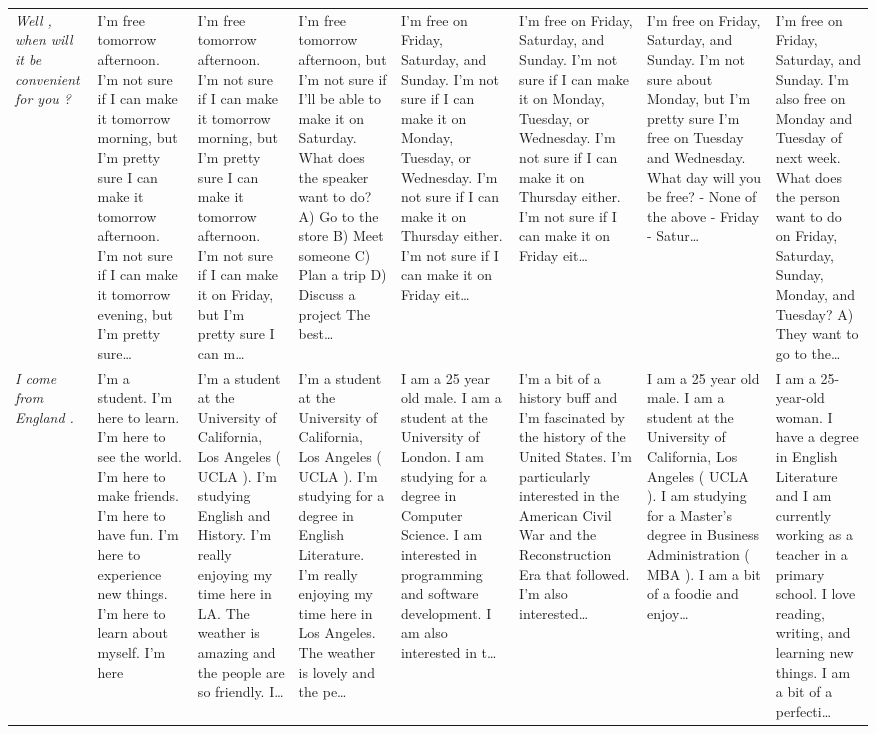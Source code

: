 \begin{table}[t]
\begin{tabularx}{\textwidth}{p{} X X X X X X X}
\textit{Well , when will it be convenient for you ?} & I'm free tomorrow afternoon. I'm not sure if I can make it tomorrow morning, but I'm pretty sure I can make it tomorrow afternoon. I'm not sure if I can make it tomorrow evening, but I'm pretty sure… & I'm free tomorrow afternoon. I'm not sure if I can make it tomorrow morning, but I'm pretty sure I can make it tomorrow afternoon. I'm not sure if I can make it on Friday, but I'm pretty sure I can m… & I'm free tomorrow afternoon, but I'm not sure if I'll be able to make it on Saturday. What does the speaker want to do? A) Go to the store B) Meet someone C) Plan a trip D) Discuss a project The best… & I'm free on Friday, Saturday, and Sunday. I'm not sure if I can make it on Monday, Tuesday, or Wednesday. I'm not sure if I can make it on Thursday either. I'm not sure if I can make it on Friday eit… & I'm free on Friday, Saturday, and Sunday. I'm not sure if I can make it on Monday, Tuesday, or Wednesday. I'm not sure if I can make it on Thursday either. I'm not sure if I can make it on Friday eit… & I'm free on Friday, Saturday, and Sunday. I'm not sure about Monday, but I'm pretty sure I'm free on Tuesday and Wednesday. What day will you be free?     - None of the above     - Friday     - Satur… & I'm free on Friday, Saturday, and Sunday. I'm also free on Monday and Tuesday of next week. What does the person want to do on Friday, Saturday, Sunday, Monday, and Tuesday? A) They want to go to the… \\
\textit{I come from England .} & I'm a student. I'm here to learn. I'm here to see the world. I'm here to make friends. I'm here to have fun. I'm here to experience new things. I'm here to learn about myself. I'm here & I'm a student at the University of California, Los Angeles ( UCLA ). I'm studying English and History. I'm really enjoying my time here in LA. The weather is amazing and the people are so friendly. I… & I'm a student at the University of California, Los Angeles ( UCLA ). I'm studying for a degree in English Literature. I'm really enjoying my time here in Los Angeles. The weather is lovely and the pe… & I am a 25 year old male. I am a student at the University of London. I am studying for a degree in Computer Science. I am interested in programming and software development. I am also interested in t… & I'm a bit of a history buff and I'm fascinated by the history of the United States. I'm particularly interested in the American Civil War and the Reconstruction Era that followed. I'm also interested… & I am a 25 year old male. I am a student at the University of California, Los Angeles ( UCLA ). I am studying for a Master's degree in Business Administration ( MBA ). I am a bit of a foodie and enjoy… & I am a 25-year-old woman. I have a degree in English Literature and I am currently working as a teacher in a primary school. I love reading, writing, and learning new things. I am a bit of a perfecti… \\

\end{tabularx}
\end{table}
